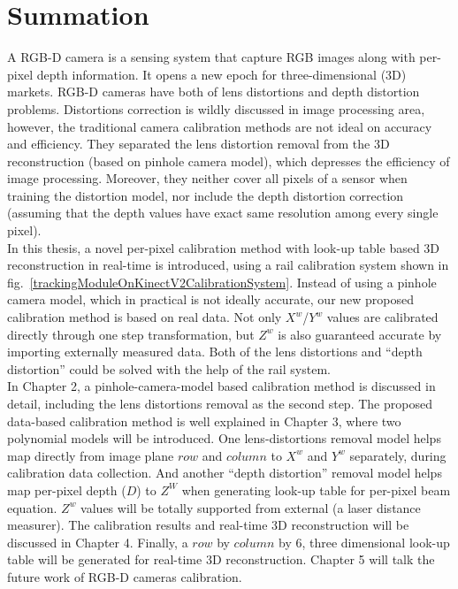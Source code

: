 \section{Summation}
\indent
A RGB-D camera is a sensing system that capture RGB images along with per-pixel depth information. It opens a new epoch for three-dimensional (3D) markets. RGB-D cameras have both of lens distortions and depth distortion problems. Distortions correction is wildly discussed in image processing area, however, the traditional camera calibration methods are not ideal on accuracy and efficiency. They separated the lens distortion removal from the 3D reconstruction (based on pinhole camera model), which depresses the efficiency of image processing. Moreover, they neither cover all pixels of a sensor when training the distortion model, nor include the depth distortion correction (assuming that the depth values have exact same resolution among every single pixel).%
\\\indent
In this thesis, a novel per-pixel calibration method with look-up table based 3D reconstruction in real-time is introduced, using a rail calibration system shown in fig.~\ref{trackingModuleOnKinectV2CalibrationSystem}. Instead of using a pinhole camera model, which in practical is not ideally accurate, our new proposed calibration method is based on real data. Not only \(X^w\)/\(Y^w\) values are calibrated directly through one step transformation, but \(Z^w\) is also guaranteed accurate by importing externally measured data. Both of the lens distortions and \enquote{depth distortion} could be solved with the help of the rail system.
\\\indent
In Chapter 2, a pinhole-camera-model based calibration method is discussed in detail, including the lens distortions removal as the second step. The proposed data-based calibration method is well explained in Chapter 3, where two polynomial models will be introduced. One lens-distortions removal model helps map directly from image plane \(row\) and \(column\) to \(X^{w}\) and \(Y^{w}\) separately, during calibration data collection. And another \enquote{depth distortion} removal model helps map per-pixel depth (\(D\)) to \(Z^W\) when generating look-up table for per-pixel beam equation. \(Z^{w}\) values will be totally supported from external (a laser distance measurer). The calibration results and real-time 3D reconstruction will be discussed in Chapter 4. Finally, a \(row\) by \(column\) by 6, three dimensional look-up table will be generated for real-time 3D reconstruction. Chapter 5 will talk the future work of RGB-D cameras calibration.
%
%
%
%
%
%
%





